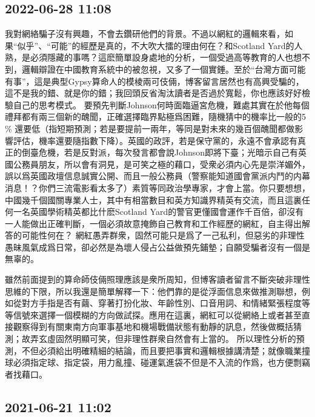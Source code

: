 \documentclass[twocolumn]{ctexart}
\begin{document}
\subsection*{2022-06-28 11:08}

我對網絡騙子沒有興趣，不會去鑽研他們的背景。不過以網紅的邏輯來看，如果“似乎”、“可能”的經歷是真的，不大吹大擂的理由何在？和Scotland Yard的人熟，是必須隱藏的事嗎？這麽簡單設身處地的分析，一個受過高等教育的人也想不到，邏輯辯證在中國教育系統中的被忽視，又多了一個實錘。至於“台灣方面可能有事”，這是典型Gypsy算命人的模棱兩可伎倆，博客留言居然也有高興受騙的，這不是我的錯、就是你的錯；我回頭反省淘汰讀者是否過於寬鬆，你也應該好好檢驗自己的思考模式。
要預先判斷Johnson何時面臨逼宮危機，難處其實在於他每個禮拜都有兩三個新的醜聞，正確選擇臨界點極爲困難，隨機猜中的機率比一般的5 \% 還要低（指短期預測；若是要提前一兩年，等同是對未來的幾百個醜聞都做影響評估，機率還要隨指數下降）。英國的政評，若是保守黨的，永遠不會承認有真正的倒臺危機，若是反對派，每次發言都會說Johnson即將下臺；光暗示自己有英國公務員朋友，所以會有洞見，是可笑之極的藉口，受衆必須内心先是崇洋媚外，誤以爲英國政壇信息誠實公開、而且一般公務員（警察能知道國會黨派内鬥的内幕消息！？你們三流電影看太多了）素質等同政治學專家，才會上當。你只要想想，中國幾千個國關專業人士，其中有相當數目和英方知識界精英有交流，而且這裏任何一名英國學術精英都比什麽Scotland Yard的警官更懂國會運作千百倍，卻沒有一人能做出正確判斷，一個必須故意掩飾自己教育和工作經歷的網紅，自主得出解答的可能性何在？
網紅愚弄群衆，固然可能只是爲了一己私利，但惡劣的非理性愚昧風氣成爲日常，卻必然是為壞人侵占公益做預先鋪墊；自願受騙者沒有一個是無辜的。

雖然前面提到的算命師伎倆照理應該是衆所周知，但博客讀者留言不斷突破非理性思維的下限，所以我還是簡單解釋一下：他們靠的是從浮面信息來做推測聯想，例如從對方手指是否有繭、穿著打扮化妝、年齡性別、口音用詞、和情緒緊張程度等等信號來選擇一個模糊的方向做試探。應用在這裏，網紅可以從網絡上或者甚至直接觀察得到有關東南方向軍事基地和機場戰備狀態有動靜的訊息，然後做概括猜測；故弄玄虛固然明顯可笑，但非理性群衆自然會有上當的。
所以理性分析的預測，不但必須給出明確精細的結論，而且要把事實和邏輯根據講清楚；就像職業撞球必須指定球、指定袋，用力亂撞、碰運氣進袋不但是不入流的作爲，也方便剽竊者找藉口。
\subsection*{2021-06-21 11:02}
\end{document}
